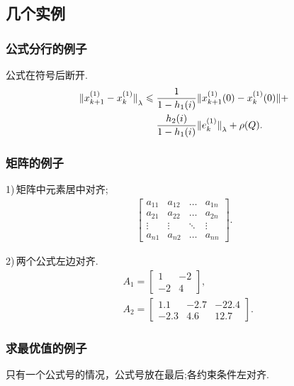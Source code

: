 \documentclass{ctacn}%
\begin{document}
\begin{multicols}{2}
\subsection{几个实例}

\subsubsection{公式分行的例子}
公式在符号后断开.
\begin{align}
{\Arrowvert x^{(1)}_{k+1}-x^{(1)}_k\Arrowvert}_\lambda\leqslant \;&
\frac{1}{1-h_1(i)}\Arrowvert x^{(1)}_{k+1}(0)-x^{(1)}_k(0)\Arrowvert+\notag\\
&\frac{h_2(i)}{1-h_1(i)}{\Arrowvert
	e^{(1)}_k\Arrowvert}_\lambda+\rho(Q).
\end{align}


\subsubsection{矩阵的例子}
1)\,矩阵中元素居中对齐;
\begin{align}
\left[\begin{array}{cccc}
a_{11}& a_{12}&\dots &a_{1n}\\
a_{21}& a_{22}&\dots &a_{2n}\\
\vdots&\vdots& \ddots   &\vdots\\
a_{n1}& a_{n2}&\dots &a_{nn}
\end{array}\right].\end{align}

2)\,两个公式左边对齐.
\begin{align}
&A_1=\left[\begin{array}{cc} 1& -2\\-2 &4
\end{array}\right],\\
&A_2=\left[\begin{array}{ccc} 1.1 &-2.7&-22.4\\-2.3 &4.6 &12.7
\end{array}\right].
\end{align}


\subsubsection{求最优值的例子}
只有一个公式号的情况，公式号放在最后;各约束条件左对齐.
\begin{center}


\end{center}
\end{multicols}
\end{document}
